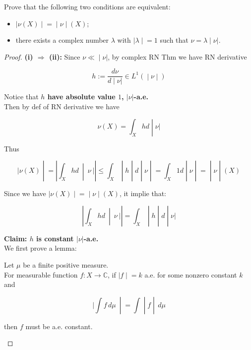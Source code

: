 \documentclass{qlnotes-export}
\begin{document}
Prove that the following two conditions are equivalent:

\begin{itemize}
\item
  \(\left. |\nu(X) \middle| = \middle| \nu \middle| (X) \right.\);
\item
  there exists a complex number \(\lambda\) with \(\left. |\lambda \middle| = 1 \right.\) such that \(\left. \nu = \lambda \middle| \nu| \right.\).
\end{itemize}

\begin{proof}

\textbf{(i) \(\Longrightarrow\) (ii):} Since \(\left. \nu \ll \middle| \nu| \right.\), by complex RN Thm we have RN derivative

\[\left. h := \frac{d\nu}{\left. d \middle| \nu| \right.} \in L^{1}( \middle| \nu \middle| ) \right.\]

Notice that \textbf{\(h\) have absolute value \(1\), \(|\nu|\)-a.e.}\\
Then by def of RN derivative we have

\[\left. \nu(X) = \int_{X}hd \middle| \nu| \right.\]

Thus

\[\left. |\nu(X) \middle| = \left| \int_{X}hd\  \middle| \ \nu\ | \right| \leq \int_{X} \middle| h \middle| d \middle| \nu \middle| = \int_{X}1d \middle| \nu \middle| = \middle| \nu \middle| (X) \right.\]

Since we have \(\left. |\nu(X) \middle| = \middle| \nu \middle| (X) \right.\), it implie that:

\[\left. \left| \int_{X}hd\  \middle| \ \nu\ | \right| = \int_{X} \middle| h \middle| d \middle| \nu| \right.\]

\textbf{Claim: \(h\) is constant \(|\nu|\)-a.e.}\\
We first prove a lemma:

\begin{lemma}

Let \(\mu\) be a finite positive measure.\\
For measurable function \(f:X\rightarrow{\mathbb{C}}\), if \(\left. |f \middle| = k \right.\) a.e. for some nonzero constant \(k\) and

\[\left. |\int f\, d\mu\  \middle| = \int \middle| f \middle| \, d\mu \right.\]

then \(f\) must be a.e. constant.

\end{lemma}


\end{proof}
\end{document}
